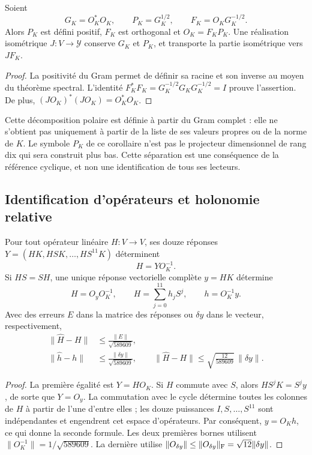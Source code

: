 \begin{corollary}
\label{lib01:polar}
Soient
\[
 G_K=O_K^*O_K,\qquad P_K=G_K^{1/2},\qquad
 F_K=O_KG_K^{-1/2}.
\]
Alors \(P_K\) est défini positif, \(F_K\) est orthogonal et
\(O_K=F_KP_K\). Une réalisation isométrique \(J:V\to\mathcal Y\)
conserve \(G_K\) et \(P_K\), et transporte la partie isométrique vers
\(JF_K\).
\end{corollary}
\begin{proof}
La positivité du Gram permet de définir sa racine et son inverse au moyen du
théorème spectral. L’identité
\(F_K^*F_K=G_K^{-1/2}G_KG_K^{-1/2}=I\) prouve l’assertion.
De plus, \((JO_K)^*(JO_K)=O_K^*O_K\).
\end{proof}

Cette décomposition polaire est définie à partir du Gram complet : elle ne s’obtient pas uniquement à partir de la
liste de ses valeurs propres ou de la norme de \(K\). Le symbole
\(P_K\) de ce corollaire n’est pas le projecteur dimensionnel de rang dix
qui sera construit plus bas. Cette séparation est une conséquence de la
référence cyclique, et non une identification de tous ses lecteurs.

\subsection{Identification d'opérateurs et holonomie relative}
\label{lib01:identificacion}

\begin{theorem}
\label{lib01:operadores}
Pour tout opérateur linéaire \(H:V\to V\), ses douze réponses \(Y=(HK,HSK,\ldots,HS^{11}K)\) déterminent
\[
 H=YO_K^{-1}.
\]
Si \(HS=SH\), une unique réponse vectorielle complète \(y=HK\) détermine
\begin{equation}
 H=O_yO_K^{-1},\qquad
 H=\sum_{j=0}^{11}h_jS^j,\qquad h=O_K^{-1}y.
 \label{lib01:filtro}
\end{equation}
Avec des erreurs \(E\) dans la matrice des réponses ou \(\delta y\) dans le
vecteur, respectivement,
\begin{align}
 \|\widehat H-H\|&\leq\frac{\|E\|}{\sqrt{589609}},
 \label{lib01:error-matriz}\\
 \|\widehat h-h\|&\leq\frac{\|\delta y\|}{\sqrt{589609}},\qquad
 \|\widehat H-H\|\leq\sqrt{\frac{12}{589609}}\,\|\delta y\|.
 \label{lib01:error-filtro}
\end{align}
\end{theorem}
\begin{proof}
La première égalité est \(Y=HO_K\). Si \(H\) commute avec \(S\), alors \(HS^jK=S^jy\), de sorte que \(Y=O_y\). La commutation avec le cycle détermine toutes les colonnes de \(H\) à partir de l'une d'entre elles ; les douze puissances \(I,S,\ldots,S^{11}\) sont indépendantes et engendrent cet espace d'opérateurs. Par conséquent, \(y=O_Kh\), ce qui donne la seconde formule. Les deux premières bornes utilisent \(\|O_K^{-1}\|=1/\sqrt{589609}\). La dernière utilise \(\|O_{\delta y}\|\leq\|O_{\delta y}\|_{\rm F}
=\sqrt{12}\|\delta y\|\).
\end{proof}

